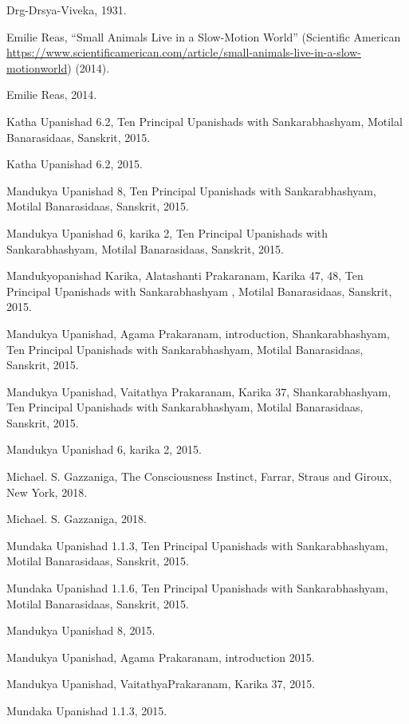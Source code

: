 \documentclass[twoside, 13pt]{article}
\begin{document}
{{{\begin{thebibliography}{99}
\bibitem{} Drg-Drsya-Viveka, 1931.

\bibitem{} Emilie Reas, “Small Animals Live in a Slow-Motion World” (Scientiﬁc American \url{https://www.scientiﬁcamerican.com/article/small-animals-live-in-a-slow-motionworld}) (2014). 

\bibitem{} Emilie Reas, 2014.

\bibitem{} Katha Upanishad 6.2, Ten Principal Upanishads with Sankarabhashyam, Motilal Banarasidaas, Sanskrit, 2015.

\bibitem{} Katha Upanishad 6.2, 2015.

\bibitem{} Mandukya Upanishad 8, Ten Principal Upanishads with Sankarabhashyam, Motilal Banarasidaas, Sanskrit, 2015.

\bibitem{} Mandukya Upanishad 6, karika 2, Ten Principal Upanishads with Sankarabhashyam, Motilal Banarasidaas, Sanskrit, 2015.

\bibitem{} Mandukyopanishad Karika, Alatashanti Prakaranam, Karika 47, 48, Ten Principal Upanishads with Sankarabhashyam , Motilal Banarasidaas, Sanskrit, 2015.

\bibitem{} Mandukya Upanishad, Agama Prakaranam, introduction, Shankarabhashyam, Ten Principal Upanishads with Sankarabhashyam, Motilal Banarasidaas, Sanskrit, 2015.

\bibitem{} Mandukya Upanishad, Vaitathya Prakaranam, Karika 37, Shankarabhashyam, Ten Principal Upanishads with Sankarabhashyam, Motilal Banarasidaas, Sanskrit, 2015.

\bibitem{} Mandukya Upanishad 6, karika 2, 2015.

\bibitem{} Michael. S. Gazzaniga, The Consciousness Instinct, Farrar, Straus and Giroux, New York, 2018.

\bibitem{} Michael. S. Gazzaniga, 2018.


\bibitem{} Mundaka Upanishad 1.1.3, Ten Principal Upanishads with Sankarabhashyam, Motilal Banarasidaas, Sanskrit, 2015.

\bibitem{} Mundaka Upanishad 1.1.6, Ten Principal Upanishads with Sankarabhashyam, Motilal Banarasidaas, Sanskrit, 2015.

\bibitem{} Mandukya Upanishad 8, 2015.

\bibitem{} Mandukya Upanishad, Agama Prakaranam, introduction 2015.

\bibitem{} Mandukya Upanishad, VaitathyaPrakaranam, Karika 37, 2015.

\bibitem{} Mundaka Upanishad 1.1.3, 2015.


\end{thebibliography}}}}
\end{document}

